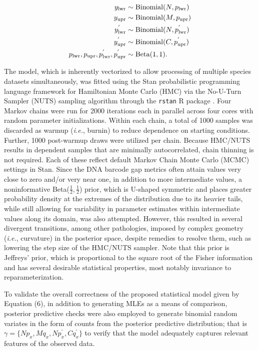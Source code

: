 \documentclass[12pt]{article}
\begin{document}
\begin{align}
\notag y_\mathrm{lwr} &\sim \mathrm{Binomial}(N, p_\mathrm{lwr}) \\ 
\notag y_\mathrm{upr} &\sim \mathrm{Binomial}(M, p_\mathrm{upr}) \\ 
y^{'}_\mathrm{lwr} &\sim \mathrm{Binomial}(N, p^{'}_\mathrm{lwr}) \\ 
 \notag y^{'}_\mathrm{upr} &\sim \mathrm{Binomial}(C, p^{'}_\mathrm{upr}) \\ 
\notag p_\mathrm{lwr}, p_\mathrm{upr}, p^{'}_\mathrm{lwr}, p^{'}_\mathrm{upr}
&\sim \mathrm{Beta}(1, 1).
\end{align}

The model, which is inherently vectorized to allow processing of multiple species datasets simultaneously, was fitted using the Stan probabilistic programming language  \citep{carpenter2017stan} framework for Hamiltonian Monte Carlo (HMC) via the No-U-Turn Sampler (NUTS) sampling algorithm \citep{hoffman2014no} through the {\tt rstan} R package \citep{stan2023rstan}. Four Markov chains were run for 2000 iterations each in parallel across four cores with random parameter initializations. Within each chain, a total of 1000 samples was discarded as warmup (\textit{i.e.}, burnin) to reduce dependence on starting conditions. Further, 1000 post-warmup draws were utilized per chain. Because HMC/NUTS results in dependent samples that are minimally autocorrelated, chain thinning is not required. Each of these reflect default Markov Chain Monte Carlo (MCMC) settings in Stan. Since the DNA barcode gap metrics often attain values very close to zero and/or very near one, in addition to more intermediate values, a noninformative Beta($\frac{1}{2}, \frac{1}{2}$) prior, which is U-shaped symmetric and places greater probability density at the extremes of the distribution due to its heavier tails, while still allowing for variability in parameter estimates within intermediate values along its domain, was also attempted. However, this resulted in several divergent transitions, among other pathologies, imposed by complex geometry (\textit{i.e.}, curvature) in the posterior space, despite remedies to resolve them, such as lowering the step size of the HMC/NUTS sampler. Note that this prior is Jeffreys' prior, which is proportional to the square root of the Fisher information and has several desirable statistical properties, most notably invariance to reparameterization. 

To validate the overall correctness of the proposed statistical model given by \\ Equation (6), in addition to generating MLEs as a means of comparison, posterior predictive checks were also employed to generate binomial random variates in the form of counts from the posterior predictive distribution; that is $\gamma = \{Np_x, Mq_x, Np^{'}_x, Cq^{'}_x\}$ to verify that the model adequately captures relevant features of the observed data.
\end{document}
